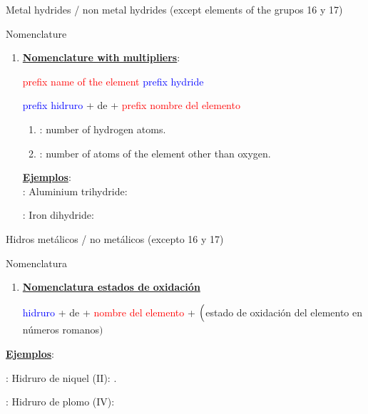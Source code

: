 \documentclass{beamer}
\newcommand{\nline}[1][6pt]{\\[#1]}
\begin{document}
\begin{frame}[t]{ Metal hydrides / non metal hydrides (except  elements of the grupos 16 y 17)}
    \begin{alertblock}{\Large Nomenclature}\vspace*{5pt}
        \begin{enumerate}[label=\itembolascolor{\arabic*}{mDarkTeal}]
            \item \textbf{\uline{Nomenclature with multipliers}}:
                  \begin{center}
                    \textcolor{red}{prefix name of the element} \textcolor{blue}{prefix} \textcolor{blue}{hydride}

                      \textcolor{blue}{prefix} \textcolor{blue}{hidruro}  + de + \textcolor{red}{prefix nombre del elemento}
                  \end{center}

                  \begin{enumerate}[label=\textcolor{red}{$\bullet$}]
                      \item {}: number of hydrogen atoms.
                      \item {}: number of atoms of the element other than oxygen.
                  \end{enumerate}

                  \textbf{\uline{Ejemplos}}:\nline

                   : Aluminium trihydride: 

                   : Iron dihydride: 
        \end{enumerate}
    \end{alertblock}
\end{frame}

\begin{frame}[t]{Hidros metálicos / no metálicos (excepto 16 y 17)}
    \begin{alertblock}{\Large
            Nomenclatura}\vspace*{5pt}
        \begin{enumerate}[label=\itembolascolor{\arabic*}{mDarkTeal}]
            \addtocounter{enumi}{1}
            \item \textbf{\uline{Nomenclatura estados de oxidación}}
                  \begin{center}
                      \textcolor{blue}{hidruro} + de + \textcolor{red}{nombre del elemento} + $\Bigl($\textcolor{green!50!black}{estado de oxidación del elemento en números romanos}$\Bigr)$
                  \end{center}
        \end{enumerate}


        \textbf{\uline{Ejemplos}}:

         : Hidruro de niquel (II): .

         : Hidruro de plomo (IV): 

    \end{alertblock}
\end{frame}
\end{document}
